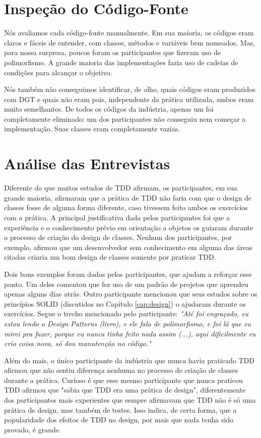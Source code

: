 \section{Inspeção do Código-Fonte}

Nós avaliamos cada código-fonte manualmente.
Em sua maioria, os códigos eram claros e fáceis de entender,
com classes, métodos e variáveis bem nomeados.
Mas, para nossa surpresa,
poucos foram os participantes que fizeram uso de polimorfismo. A grande
maioria das implementações fazia uso de cadeias de condições para 
alcançar o objetivo.

Nós também não conseguimos identificar, de olho, quais códigos
eram produzidos com DGT e quais não eram pois, independente
da prática utilizada, ambos eram muito semelhantes.
De todos os códigos da indústria, apenas um foi completamente eliminado:
um dos participantes não conseguiu nem começar a implementação. Suas classes
eram completamente vazias. 

\section{Análise das Entrevistas}

Diferente do que muitos estudos de TDD afirmam, os participantes, em sua grande maioria, afirmaram que 
a prática de TDD não faria com que o design de classes fosse de alguma forma diferente, caso tivessem
feito ambos os exercícios com a prática.
A principal justificativa dada pelos participantes foi que a experiência e o conhecimento prévio
em orientação a objetos os guiaram durante o processo de criação do design de classes. Nenhum dos
participantes, por exemplo, afirmou que um desenvolvedor sem conhecimento em alguma das áreas
citadas criaria um bom design de classes somente por praticar TDD.

Dois bons exemplos foram dados pelos participantes, que ajudam a reforçar esse ponto. Um deles
comentou que fez uso de um padrão de projetos \cite{gof} que aprendeu apenas alguns dias atrás.
Outro participante mencionou que seus estudos sobre os princípios SOLID (discutidos no Capítulo \ref{cap:design})
o ajudaram durante os exercícios. Segue o trecho mencionado pelo participante:
\textit{"Até foi engraçado, eu estou lendo o Design Patterns (livro), e ele fala de polimorfismo, e foi
lá que eu mirei pra fazer, porque eu nunca tinha feito nada assim (...), aqui dificilmente eu crio
coisa nova, só dou manutenção no código."}

Além do mais, o único participante da indústria que nunca havia
praticado TDD afirmou que não sentiu diferença nenhuma no processo de criação de classes durante
a prática.
Curioso é que esse mesmo participante que nunca praticou TDD afirmou que "sabia que TDD era uma prática de design",
diferentemente dos participantes mais experientes que sempre afirmavam que TDD não é só uma prática de design,
mas também de testes. Isso indica, de certa forma, que a popularidade dos efeitos de TDD no design, por mais
que nada tenha sido provado, é grande.

